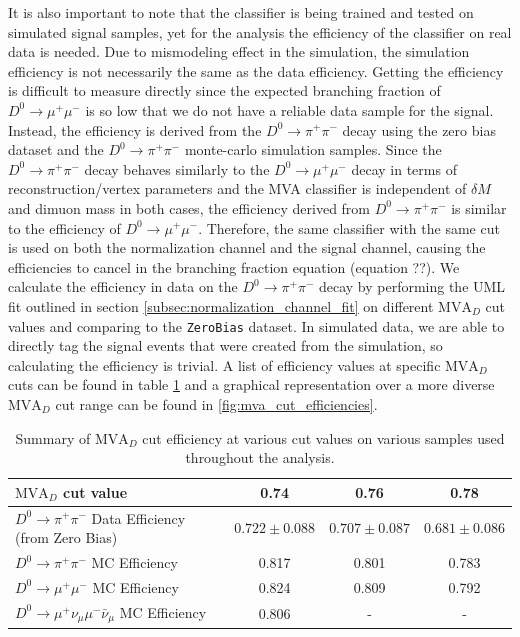 It is also important to note that the classifier is being trained and tested on simulated signal samples, yet for the analysis the efficiency of the classifier on real data is needed. Due to mismodeling effect in the simulation, the simulation efficiency is not necessarily the same as the data efficiency. Getting the efficiency is difficult to measure directly since the expected branching fraction of $D^0 \to \mu^+ \mu^-$ is so low that we do not have a reliable data sample for the signal. Instead, the efficiency is derived from the $D^0 \to \pi^+ \pi^-$ decay using the zero bias dataset and the $D^0 \to \pi^+ \pi^-$ monte-carlo simulation samples. Since the $D^0 \to \pi^+ \pi^-$ decay behaves similarly to the $D^0 \to \mu^+ \mu^-$ decay in terms of reconstruction/vertex parameters and the MVA classifier is independent of $\delta M$ and dimuon mass in both cases, the efficiency derived from $D^0 \to \pi^+ \pi^-$ is similar to the efficiency of $D^0 \to \mu^+ \mu^-$. Therefore, the same classifier with the same cut is used on both the normalization channel and the signal channel, causing the efficiencies to cancel in the branching fraction equation (equation ??). We calculate the efficiency in data on the $D^0 \to \pi^+ \pi^-$ decay by performing the UML fit outlined in section \ref{subsec:normalization_channel_fit} on different $\text{MVA}_D$ cut values and comparing to the \texttt{ZeroBias} dataset. In simulated data, we are able to directly tag the signal events that were created from the simulation, so calculating the efficiency is trivial. A list of efficiency values at specific $\text{MVA}_D$ cuts can be found in table \ref{tab:mva_cut_efficiencies} and a graphical representation over a more diverse $\text{MVA}_D$ cut range can be found in \ref{fig:mva_cut_efficiencies}.


\begin{table}[htbp]
    \centering
    \begin{tabular}{|l|c|c|c|}
    \hline
    $\text{MVA}_D$ cut value & \textbf{0.74} & \textbf{0.76} & \textbf{0.78} \\
    \hline
    $D^0 \to \pi^+ \pi^-$ Data Efficiency (from Zero Bias) & $0.722 \pm 0.088$ & $0.707 \pm 0.087$ & $0.681 \pm 0.086$ \\
    $D^0 \to \pi^+ \pi^-$ MC Efficiency & 0.817 & 0.801 & 0.783 \\
    $D^0 \to \mu^+ \mu^-$ MC Efficiency & 0.824 & 0.809 & 0.792 \\
    $D^0 \to \mu^+\nu_\mu\mu^-\bar{\nu}_\mu$ MC Efficiency & 0.806 & - & - \\
    \hline
    \end{tabular}
    \caption{Summary of $\text{MVA}_D$ cut efficiency at various cut values on various samples used throughout the analysis.}
    \label{tab:mva_cut_efficiencies}
\end{table}

